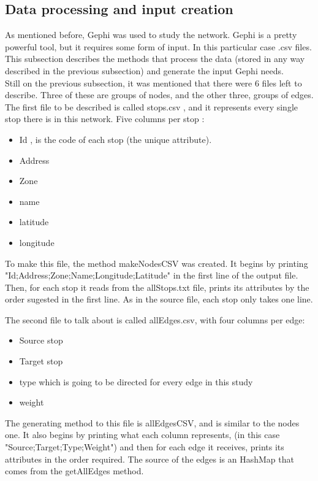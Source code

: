 \documentclass[12pt]{article}
\begin{document}
\begin{multicols}{2}
\subsection{Data processing and input creation}
	
	As mentioned before, Gephi was used to study the network. Gephi is a pretty powerful tool, but it requires some form of input. In this particular case .csv files. This subsection describes the methods that process the data (stored in any way described in the previous subsection) and generate the input Gephi needs.\\
	Still on the previous subsection, it was mentioned that there were 6 files left to describe. Three of these are groups of nodes, and the other three, groups of edges.\\
	
	
The first file to be described is called stops.csv , and it represents every single stop there is in this network. Five columns per stop :
	
	\begin{itemize}
		\item Id , is the code of each stop (the unique attribute).
		\item Address
		\item Zone
		\item name
		\item latitude
		\item longitude
	\end{itemize}
	
	To make this file, the method makeNodesCSV was created.
	It begins by printing "Id;Address;Zone;Name;Longitude;Latitude" in the first line of the output file. Then, for each stop it reads from the allStops.txt file, prints its attributes by the order sugested in the first line. As in the source file, each stop only takes one line.
	
	The second file to talk about is called allEdges.csv, with four columns per edge:
	
	\begin{itemize}
		\item Source stop
		\item Target stop
		\item type which is going to be directed for every edge in this study
		\item weight 
	\end{itemize}
	
	The generating method to this file is allEdgesCSV, and is similar to the nodes one.
	It also begins by printing what each column represents, (in this case "Source;Target;Type;Weight") and then for each edge it receives, prints its attributes in the order required. The source of the edges is an HashMap that comes from the getAllEdges method.\\


\end{multicols}
\end{document}
